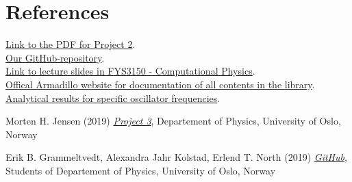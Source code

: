 \documentclass{article}
\begin{document}

\vspace{1cm}

\section{References} \label{sec:References}

\href{https://github.com/CompPhysics/ComputationalPhysics/blob/master/doc/Projects/2019/Project2/pdf/Project2.pdf}{Link to the PDF for Project 2}. \\

\href{https://github.com/Erikbgram/Fys3150}{Our GitHub-repository}. \\

\href{https://github.com/CompPhysics/ComputationalPhysics/blob/master/doc/Lectures/lectures2015.pdf}{Link to lecture slides in FYS3150 - Computational Physics}. \\

\href{http://arma.sourceforge.net/docs.html#eig_sym}{Offical Armadillo website for documentation of all contents in the library}. \\

\href{https://journals.aps.org/pra/pdf/10.1103/PhysRevA.48.3561}{Analytical results for specific oscillator frequencies}. \\

\begin{thebibliography}{}
Morten H. Jensen (2019) \emph{\href{https://github.com/CompPhysics/ComputationalPhysics/blob/master/doc/Projects/2019/Project3/pdf/Project3.pdf}{Project 3}}, Departement of Physics, University of Oslo, Norway

Erik B. Grammeltvedt, Alexandra Jahr Kolstad, Erlend T. North (2019) \emph{\href{https://github.com/Erikbgram/Fys3150}{GitHub}}, Students of Departement of Physics, University of Oslo, Norway
\end{thebibliography}







\end{document}
